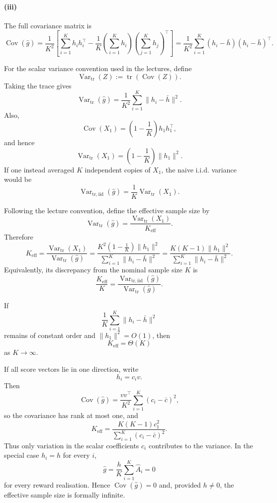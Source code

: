 \paragraph{(iii)}
The full covariance matrix is
\[
\boxed{
\operatorname{Cov}(\hat g)
=
\frac{1}{K^2}
\left[
\sum_{i=1}^K h_i h_i^\top
-
\frac{1}{K}
\left(\sum_{i=1}^K h_i\right)
\left(\sum_{j=1}^K h_j\right)^\top
\right]
=
\frac{1}{K^2}
\sum_{i=1}^K
(h_i-\bar h)(h_i-\bar h)^\top .
}
\]

For the scalar variance convention used in the lectures, define
\[
\operatorname{Var}_{\mathrm{tr}}(Z)
:=
\operatorname{tr}\!\left(\operatorname{Cov}(Z)\right).
\]
Taking the trace gives
\[
\boxed{
\operatorname{Var}_{\mathrm{tr}}(\hat g)
=
\frac{1}{K^2}
\sum_{i=1}^K
\|h_i-\bar h\|^2.
}
\]
Also,
\[
\operatorname{Cov}(X_1)
=
\left(1-\frac{1}{K}\right)h_1h_1^\top,
\]
and hence
\[
\operatorname{Var}_{\mathrm{tr}}(X_1)
=
\left(1-\frac{1}{K}\right)\|h_1\|^2.
\]
If one instead averaged $K$ independent copies of $X_1$, the naive i.i.d.
variance would be
\[
\operatorname{Var}_{\mathrm{tr,iid}}(\hat g)
=
\frac{1}{K}\operatorname{Var}_{\mathrm{tr}}(X_1).
\]

Following the lecture convention, define the effective sample size by
\[
\operatorname{Var}_{\mathrm{tr}}(\hat g)
=
\frac{\operatorname{Var}_{\mathrm{tr}}(X_1)}
{K_{\mathrm{eff}}}.
\]
Therefore
\[
\boxed{
K_{\mathrm{eff}}
=
\frac{
\operatorname{Var}_{\mathrm{tr}}(X_1)
}{
\operatorname{Var}_{\mathrm{tr}}(\hat g)
}
=
\frac{
K^2\left(1-\frac{1}{K}\right)\|h_1\|^2
}{
\sum_{i=1}^K\|h_i-\bar h\|^2
}
=
\frac{
K(K-1)\|h_1\|^2
}{
\sum_{i=1}^K\|h_i-\bar h\|^2
}.
}
\]
Equivalently, its discrepancy from the nominal sample size $K$ is
\[
\frac{K_{\mathrm{eff}}}{K}
=
\frac{
\operatorname{Var}_{\mathrm{tr,iid}}(\hat g)
}{
\operatorname{Var}_{\mathrm{tr}}(\hat g)
}.
\]

If
\[
\frac{1}{K}\sum_{i=1}^K\|h_i-\bar h\|^2
\]
remains of constant order and $\|h_1\|^2=O(1)$, then
\[
K_{\mathrm{eff}}=\Theta(K)
\]
as $K\to\infty$.

If all score vectors lie in one direction, write
\[
h_i=c_i v.
\]
Then
\[
\operatorname{Cov}(\hat g)
=
\frac{vv^\top}{K^2}
\sum_{i=1}^K(c_i-\bar c)^2,
\]
so the covariance has rank at most one, and
\[
K_{\mathrm{eff}}
=
\frac{
K(K-1)c_1^2
}{
\sum_{i=1}^K(c_i-\bar c)^2
}.
\]
Thus only variation in the scalar coefficients $c_i$ contributes to the
variance. In the special case $h_i=h$ for every $i$,
\[
\hat g
=
\frac{h}{K}\sum_{i=1}^K\hat A_i
=0
\]
for every reward realisation. Hence
$\operatorname{Cov}(\hat g)=0$ and, provided $h\neq0$, the effective sample size
is formally infinite.


